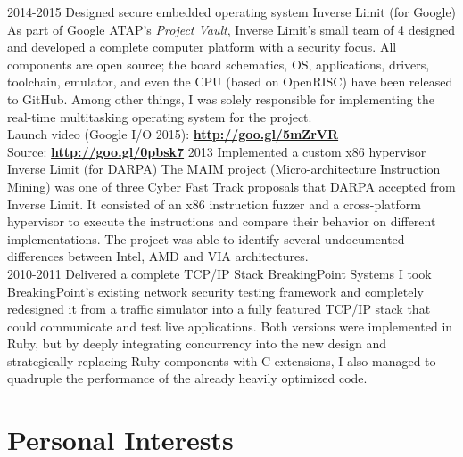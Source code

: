 \documentclass[]{friggeri-cv}
\begin{document}
\begin{entrylist}
  \entry
      {2014-2015}
      {Designed secure embedded operating system}
      {Inverse Limit (for Google)}
      {
        As part of Google ATAP's \emph{Project Vault}, Inverse Limit's small team of 4 designed and developed a complete computer platform with a security focus. All components are open source; the board schematics, OS, applications, drivers, toolchain, emulator, and even the CPU (based on OpenRISC) have been released to GitHub. Among other things, I was solely responsible for implementing the real-time multitasking operating system for the project.\\
%        

        Launch video (Google I/O 2015): \hfill \href{http://goo.gl/5mZrVR}{\textbf{http://goo.gl/5mZrVR}}\\
        Source: \hfill \href{http://goo.gl/0pbsk7}{\textbf{http://goo.gl/0pbsk7}}
      }
  \entry
      {2013}
      {Implemented a custom x86 hypervisor}
      {Inverse Limit (for DARPA)}
      {The MAIM project (Micro-architecture Instruction Mining) was one of three Cyber Fast Track proposals that DARPA accepted from Inverse Limit. It consisted of an x86 instruction fuzzer and a cross-platform hypervisor to execute the instructions and compare their behavior on different implementations. The project was able to identify several undocumented differences between Intel, AMD and VIA architectures.\\

      }
  \entry
      {2010-2011}
      {Delivered a complete TCP/IP Stack}
      {BreakingPoint Systems}
      {I took BreakingPoint's existing network security testing framework and completely redesigned it from a traffic simulator into a fully featured TCP/IP stack that could communicate and test live applications. Both versions were implemented in Ruby, but by deeply integrating concurrency into the new design and strategically replacing Ruby components with C extensions, I also managed to quadruple the performance of the already heavily optimized code.}
\end{entrylist}
\section{Personal Interests}
\end{document}
